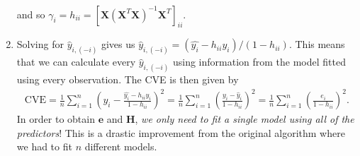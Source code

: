 \documentclass[10pt]{article}
\begin{document}
\begin{enumerate}
\begin{align}
    \end{align}
    and so \(\gamma_i = h_{ii} = [\mathbf{X}(\mathbf{X}^T\mathbf{X})^{-1}\mathbf{X}^T]_{ii}\).
    \item Solving for \(\hat{y}_{i,(-i)}\) gives us \(\hat{y}_{i,(-i)} = (\hat{y_i} - h_{ii}y_i)/(1 - h_{ii})\). This means that we can calculate every 
    \(\hat{y}_{i,(-i)}\) using information from the model fitted using every observation. The CVE is then given by 
    \begin{align*}
        \mathrm{CVE}
        = \frac{1}{n} \sum_{i=1}^n \left( y_i - \frac{\hat{y_i} - h_{ii}y_i}{1 - h_{ii}} \right)^2
        = \frac{1}{n} \sum_{i=1}^n \left( \frac{y_i - \hat{y}_i}{1 - h_{ii}} \right)^2
        = \frac{1}{n} \sum_{i=1}^n \left( \frac{e_i}{1 - h_{ii}} \right)^2.
    \end{align*}
    In order to obtain \(\mathbf{e}\) and \(\mathbf{H}\), \textsl{we only need to fit a single model using all of the predictors}! This is a drastic improvement
    from the original algorithm where we had to fit \(n\) different models. 
\end{enumerate}

\newcommand{\rn}{N}
\end{document}
